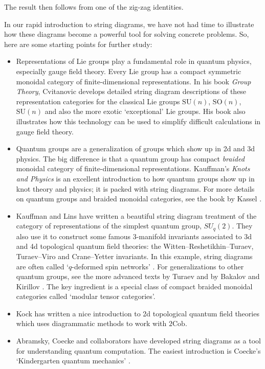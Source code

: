 \documentclass[12pt]{article}
\newcommand{\Cob}{\mathrm{Cob}}
\begin{document}
The result then follows from one of the zig-zag identities.  

In our rapid introduction to string diagrams, we have not had
time to illustrate how these diagrams become a powerful tool for
solving concrete problems.  So, here are some starting points
for further study:

\begin{itemize}
\item 
Representations of Lie groups play a fundamental
role in quantum physics, especially gauge field theory.  
Every Lie group has a compact symmetric monoidal
category of finite-dimensional representations.  In his book
{\sl Group Theory}, Cvitanovic \cite{Cvitanovic} develops 
detailed string diagram descriptions 
of these representation categories for the classical Lie groups 
$\mathrm{SU}(n)$, $\mathrm{SO}(n)$, $\mathrm{SU}(n)$ and 
also the more exotic `exceptional' Lie groups.
His book also illustrates how this technology can be used to 
simplify difficult calculations in gauge field theory.
\item 
Quantum groups are a generalization of groups which show
up in 2d and 3d physics.  The big difference is that a quantum
group has compact {\em braided} monoidal category of finite-dimensional
representations.  Kauffman's {\sl Knots and Physics} \cite{Kauffman} 
is an excellent introduction to how quantum groups show up 
in knot theory and physics; it is packed with string diagrams.  
For more details on quantum groups and braided monoidal categories, 
see the book by Kassel \cite{Kassel}.
\item 
Kauffman and Lins \cite{KL} have written a beautiful string 
diagram treatment of the category of representations of the simplest 
quantum group, $SU_q(2)$.  They also use it to construct some famous 
3-manifold invariants associated to 3d and 4d topological quantum field 
theories: the Witten--Reshetikhin--Turaev, Turaev--Viro and Crane--Yetter 
invariants.  In this example, string diagrams are often called 
`$q$-deformed spin networks' \cite{Smolin}.  For generalizations to 
other quantum groups, see the more advanced texts by Turaev 
\cite{Turaev} and by Bakalov and Kirillov \cite{BK}.
The key ingredient is a special class of compact braided monoidal 
categories called `modular tensor categories'.
\item Kock \cite{Kock} has written a nice introduction to 2d 
topological quantum field theories which uses diagrammatic
methods to work with $2\Cob$.
\item 
Abramsky, Coecke and collaborators \cite{Abramsky,AC,AD,Coecke1,
CP1,CP2} have developed string diagrams as a tool for understanding
quantum computation.  The easiest introduction is Coecke's 
`Kindergarten quantum mechanics' \cite{Coecke2}.
\end{itemize}
\end{document}
